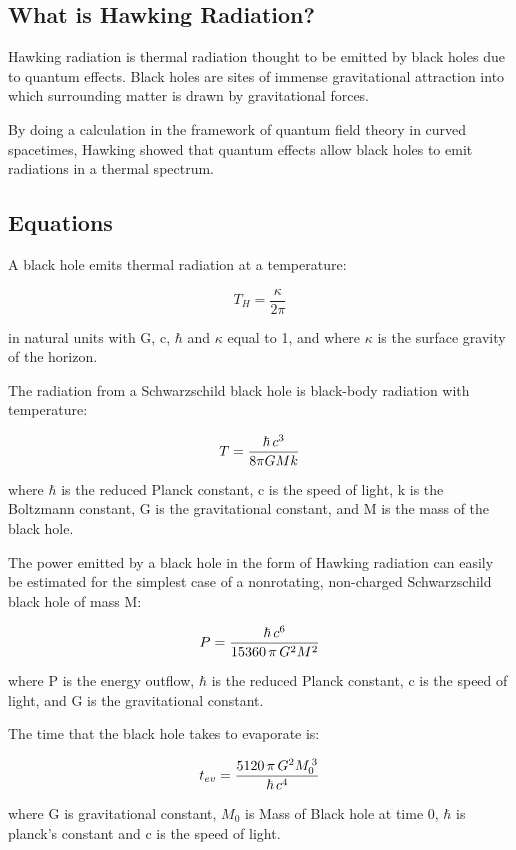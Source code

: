 \subsection{What is Hawking Radiation?}
{

Hawking radiation is thermal radiation thought to be emitted by black holes due to quantum effects. Black holes are sites of immense gravitational attraction into which surrounding matter is drawn by gravitational forces.


By doing a calculation in the framework of quantum field theory in curved spacetimes, Hawking showed that quantum effects allow black holes to emit radiations in a thermal spectrum.
}

\subsection{Equations}
{

A black hole emits thermal radiation at a temperature:

	\begin{equation}
	T_H = \frac{\kappa}{2 \pi}
	\end{equation}

in natural units with G, c, $\hbar$ and $\kappa$ equal to 1, and where $\kappa$ is the surface gravity of the horizon. \newline



The radiation from a Schwarzschild black hole is black-body radiation with temperature:

	\begin{equation}
	T={\hbar\,c^3\over8\pi G M k}
	\end{equation}

where $\hbar$ is the reduced Planck constant, c is the speed of light, k is the Boltzmann constant, G is the gravitational constant, and M is the mass of the black hole.
\newline



The power emitted by a black hole in the form of Hawking radiation can easily be estimated for the simplest case of a nonrotating, non-charged Schwarzschild black hole of mass M:

	\begin{equation}
	P={\hbar\,c^6\over15360\,\pi\,G^2M^2}
	\end{equation}

where P is the energy outflow, $\hbar$ is the reduced Planck constant, c is the speed of light, and G is the gravitational constant.
\newline



The time that the black hole takes to evaporate is:

	\begin{equation}
	t_{ev}={5120\,\pi\,G^2M_0^{\,3}\over\hbar\,c^4}
	\end{equation}

where G is gravitational constant, $M_0$ is Mass of Black hole at time 0, $\hbar$ is planck's constant and c is the speed of light.
}
